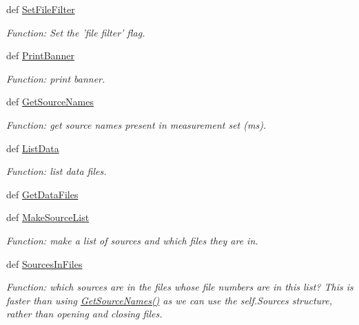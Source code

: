 \begin{DoxyCompactItemize}
def \hyperlink{class_pipeline_1_1_pipeline_af727d9a5891eb7e18de5217d223cce77}{\-Set\-File\-Filter}
\begin{DoxyCompactList}\small\item\em \-Function\-: \-Set the 'file filter' flag. \end{DoxyCompactList}\item 
def \hyperlink{class_pipeline_1_1_pipeline_a08cb50fbe96c3169a7aed146814bcae5}{\-Print\-Banner}
\begin{DoxyCompactList}\small\item\em \-Function\-: print banner. \end{DoxyCompactList}\item 
def \hyperlink{class_pipeline_1_1_pipeline_a6b4be370ebed0677a4f78bfd66b77097}{\-Get\-Source\-Names}
\begin{DoxyCompactList}\small\item\em \-Function\-: get source names present in measurement set (ms). \end{DoxyCompactList}\item 
def \hyperlink{class_pipeline_1_1_pipeline_af48c98a68c5b3c9ef7c75cbd4373895a}{\-List\-Data}
\begin{DoxyCompactList}\small\item\em \-Function\-: list data files. \end{DoxyCompactList}\item 
def \hyperlink{class_pipeline_1_1_pipeline_af143266291b16cd8b96aaaac83f488ce}{\-Get\-Data\-Files}
\item 
def \hyperlink{class_pipeline_1_1_pipeline_a09e2dfa545d0423e8281d844d1db42b3}{\-Make\-Source\-List}
\begin{DoxyCompactList}\small\item\em \-Function\-: make a list of sources and which files they are in. \end{DoxyCompactList}\item 
def \hyperlink{class_pipeline_1_1_pipeline_a5b7e17e60c075e0564db97adc526f955}{\-Sources\-In\-Files}
\begin{DoxyCompactList}\small\item\em \-Function\-: which sources are in the files whose file numbers are in this list? \-This is faster than using \hyperlink{class_pipeline_1_1_pipeline_a6b4be370ebed0677a4f78bfd66b77097}{\-Get\-Source\-Names()} as we can use the self.\-Sources structure, rather than opening and closing files. \end{DoxyCompactList}\item 

\end{DoxyCompactItemize}
